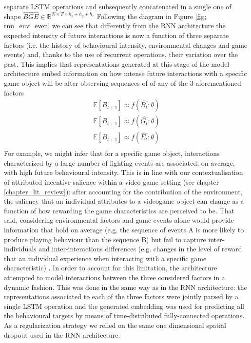 separate LSTM operations and subsequently concatenated in a single one of shape $\widehat{B}\widehat{G}\widehat{E}  \in \mathbb{R}^{N \times T \times h_b + h_g + h_e}$ Following the diagram in Figure \ref{fig: rnn_env_even} we can see that differently from the RNN architecture the expected intensity of future interactions is now a function of three separate factors (i.e. the history of behavioural intensity, environmental changes and game events) and, thanks to the use of recurrent operations, their variation over the past. This implies that representations generated at this stage of the model architecture embed information on how intense future interactions with a specific game object will be after observing sequences of of any of the 3 aforementioned factors
\begin{gather}
\label{rnn_env_even_1_exp}
   \mathbb{E}[B_{t+1}] \approx  f(\widehat{B_t}; \theta) \\ \nonumber  
   \mathbb{E}[B_{t+1}] \approx  f(\widehat{G_t}; \theta) \\ \nonumber  
   \mathbb{E}[B_{t+1}] \approx  f(\widehat{E_t}; \theta) \\ \nonumber  
\end{gather}
For example, we might infer that for a specific game object, interactions characterized by a large number of fighting events are associated, on average, with high future behavioural intensity. This is in line with our contextualisation of attributed incentive salience within a video game setting (see chapter \ref{chapter_lit_review}): after accounting for the contribution of the environment, the saliency that an individual attributes to a videogame object can change as a function of how rewarding the game characteristics are perceived to be. That said, considering environmental factors and game events alone would provide information that hold on average (e.g. the sequence of events A is more likely to produce playing behaviour than the sequence B) but fail to capture inter-individuals and inter-interactions differences (e.g. changes in the level of reward that an individual experience when interacting with a specific game characteristic) . In order to account for this limitation, the architecture attempted to model interactions between the three considered factors in a dynamic fashion. This was done in the same way as in the RNN architecture: the representations associated to each of the three factors were jointly parsed by a single LSTM operation and the generated embedding was used for predicting all the behavioural targets by means of time-distributed fully-connected operations. As a regularization strategy we relied on the same one dimensional spatial dropout used in the RNN architecture.

